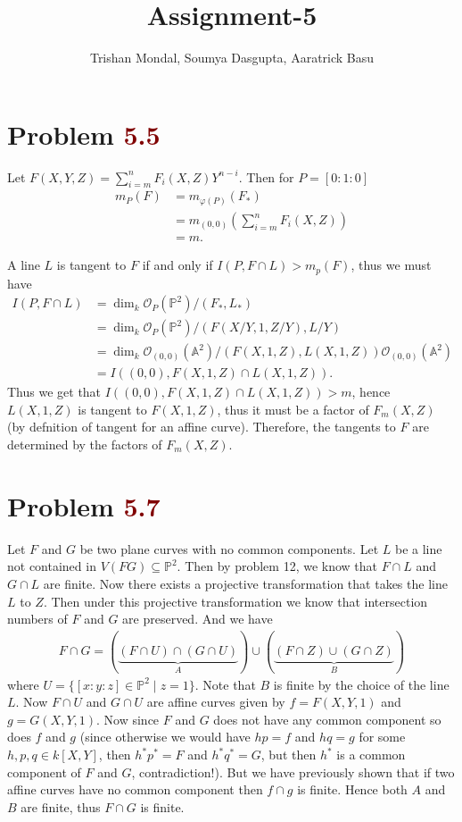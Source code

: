 \documentclass[12pt]{article}
\title{\textbf{Assignment-5}}
\author{Trishan Mondal, Soumya Dasgupta, Aaratrick Basu}
\date{}
\begin{document}
\maketitle

\section*{Problem \textcolor{maroon}{5.5}}
Let $F(X,Y,Z) = \sum_{i=m}^n F_i(X,Z) Y^{n-i}$. Then for $P = [0:1:0]$
\begin{align*}
   m_P(F) &= m_{\varphi(P)}(F_*) \\ 
   &= m_{(0,0)}(\sum_{i=m}^n F_i(X,Z)) \\ 
   &= m.
\end{align*}

A line $L$ is tangent to $F$ if and only if $I(P, F \cap L) > m_p(F)$, thus we must have 
\begin{align*}
   I(P,F \cap L) &= \dim_{k} \mathscr{O}_P(\mathbb{P}^2)/(F_*,L_*) \\
   &= \dim_k \mathscr{O}_P(\mathbb{P}^2)/(F(X/Y,1,Z/Y), L/Y) \\ 
   &= \dim_k \mathscr{O}_{(0,0)}(\mathbb{A}^2)/(F(X,1,Z), L(X,1,Z)) \mathscr{O}_{(0,0)}(\mathbb{A}^2) \\ 
   &= I((0,0), F(X,1,Z) \cap L(X,1,Z)).
\end{align*}
Thus we get that $I((0,0), F(X,1,Z) \cap L(X,1,Z)) > m$, hence $L(X,1,Z)$ is tangent to $F(X,1,Z)$, thus it must be a factor of $F_m(X,Z)$ (by defnition of tangent for an affine curve). Therefore, the tangents to $F$ are determined by the factors of $F_m(X,Z)$.

\section*{Problem \textcolor{maroon}{5.7}}
Let $F$ and $G$ be two plane curves with no common components. Let $L$ be a line not contained in $V(FG) \subseteq \mathbb{P}^2$. Then by problem 12, we know that $F \cap L$ and $G \cap L$ are finite. Now there exists a projective transformation that takes the line $L$ to $Z$. Then under this projective transformation we know that intersection numbers of $F$ and $G$ are preserved. And we have 
\begin{align*}
   F \cap G = (\underbrace{(F \cap U) \cap (G \cap U)}_{A}) \cup (\underbrace{(F \cap Z) \cup (G \cap Z)}_{B})
\end{align*}
where $U = \{ [x:y:z] \in \mathbb{P}^2 \mid z = 1 \}$. Note that $B$ is finite by the choice of the line $L$. Now $F \cap U$ and $G \cap U$ are affine curves given by $f = F(X,Y,1)$ and $g = G(X,Y,1)$. Now since $F$ and $G$ does not have any common component so does $f$ and $g$ (since otherwise we would have $hp = f$ and $hq = g$ for some $h,p,q \in k[X,Y]$, then $h^* p^* = F$ and $h^* q^* = G$, but then $h^*$ is a common component of $F$ and $G$, contradiction!). But we have previously shown that if two affine curves have no common component then $f \cap g$ is finite. Hence both $A$ and $B$ are finite, thus $F \cap G$ is finite. 
\end{document}
